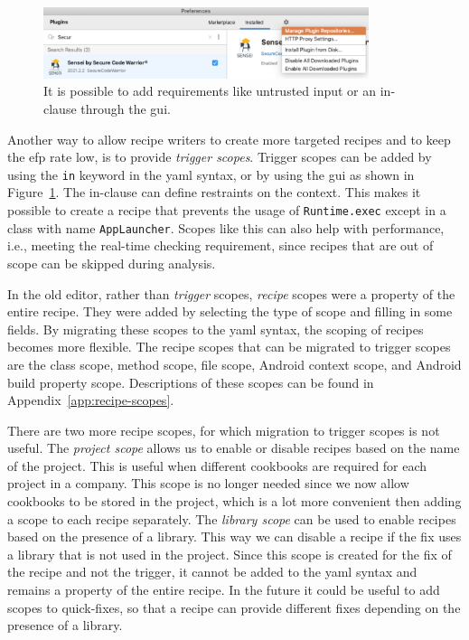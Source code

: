 \begin{figure}[t]
  \centering
  \includegraphics[width=0.85\textwidth,page=9]{04-tools/figures/figures2.pdf}
  \caption[\Gls{gui} to add the requirement of untrusted input.]{It is possible to add requirements like untrusted input or an in-clause through the \gls{gui}.}
  \label{fig:recipegui}
\end{figure}

Another way to allow recipe writers to create more targeted recipes and to keep the \gls{efp} rate low, is to provide \emph{trigger scopes}.
Trigger scopes can be added by using the \texttt{in} keyword in the \gls{yaml} syntax, or by using the \gls{gui} as shown in Figure~\ref{fig:recipegui}.
The in-clause can define restraints on the context.
This makes it possible to create a recipe that prevents the usage of \texttt{Runtime.exec} except in a class with name \texttt{AppLauncher}.
Scopes like this can also help with performance, i.e., meeting the real-time checking requirement, since recipes that are out of scope can be skipped during analysis.

In the old editor, rather than \emph{trigger} scopes, \emph{recipe} scopes were a property of the entire recipe.
They were added by selecting the type of scope and filling in some fields.
By migrating these scopes to the \gls{yaml} syntax, the scoping of recipes becomes more flexible.
The recipe scopes that can be migrated to trigger scopes are the class scope, method scope, file scope, Android context scope, and Android build property scope.
Descriptions of these scopes can be found in Appendix~\ref{app:recipe-scopes}.

There are two more recipe scopes, for which migration to trigger scopes is not useful.
The \emph{project scope} allows us to enable or disable recipes based on the name of the project.
This is useful when different cookbooks are required for each project in a company.
This scope is no longer needed since we now allow cookbooks to be stored in the project, which is a lot more convenient then adding a scope to each recipe separately.
The \emph{library scope} can be used to enable recipes based on the presence of a library.
This way we can disable a recipe if the fix uses a library that is not used in the project.
Since this scope is created for the fix of the recipe and not the trigger, it cannot be added to the \gls{yaml} syntax and remains a property of the entire recipe.
In the future it could be useful to add scopes to quick-fixes, so that a recipe can provide different fixes depending on the presence of a library.

